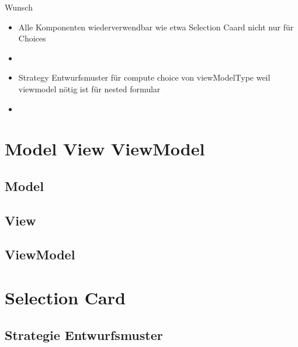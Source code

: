 \documentclass[12pt, twoside]{article}
\begin{document}
 







Wunsch
\begin{itemize}
	\item Alle Komponenten wiederverwendbar wie etwa Selection Caard nicht nur für Choices
	\item 
\end{itemize}

\begin{itemize}
	\item Strategy Entwurfsmuster für compute choice von viewModelType weil viewmodel nötig ist für nested formular
	\item 
\end{itemize}

\section{Model View ViewModel}

\subsection{Model}
\subsection{View}
\subsection{ViewModel} 


\section{Selection Card}

\subsection{Strategie Entwurfsmuster}
\end{document}
